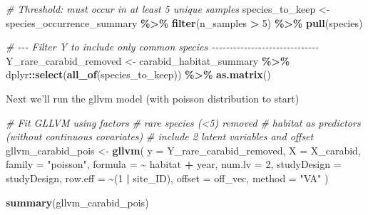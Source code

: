 \documentclass[
]{article}
\newenvironment{Shaded}{\begin{snugshade}}{\end{snugshade}}
\newcommand{\AttributeTok}[1]{\textcolor[rgb]{0.13,0.29,0.53}{#1}}
\newcommand{\CommentTok}[1]{\textcolor[rgb]{0.56,0.35,0.01}{\textit{#1}}}
\newcommand{\DecValTok}[1]{\textcolor[rgb]{0.00,0.00,0.81}{#1}}
\newcommand{\FunctionTok}[1]{\textcolor[rgb]{0.13,0.29,0.53}{\textbf{#1}}}
\newcommand{\NormalTok}[1]{#1}
\newcommand{\OtherTok}[1]{\textcolor[rgb]{0.56,0.35,0.01}{#1}}
\newcommand{\SpecialCharTok}[1]{\textcolor[rgb]{0.81,0.36,0.00}{\textbf{#1}}}
\newcommand{\StringTok}[1]{\textcolor[rgb]{0.31,0.60,0.02}{#1}}
\begin{document}
\begin{Shaded}
\begin{Highlighting}[]
\CommentTok{\# Threshold: must occur in at least 5 unique samples}
\NormalTok{species\_to\_keep }\OtherTok{\textless{}{-}}\NormalTok{ species\_occurrence\_summary }\SpecialCharTok{\%\textgreater{}\%}
  \FunctionTok{filter}\NormalTok{(n\_samples }\SpecialCharTok{\textgreater{}} \DecValTok{5}\NormalTok{) }\SpecialCharTok{\%\textgreater{}\%}
  \FunctionTok{pull}\NormalTok{(species)}

\CommentTok{\# {-}{-}{-} Filter Y to include only common species {-}{-}{-}{-}{-}{-}{-}{-}{-}{-}{-}{-}{-}{-}{-}{-}{-}{-}{-}{-}{-}{-}{-}{-}{-}{-}{-}{-}{-}{-}}
\NormalTok{Y\_rare\_carabid\_removed }\OtherTok{\textless{}{-}}\NormalTok{ carabid\_habitat\_summary }\SpecialCharTok{\%\textgreater{}\%}
\NormalTok{  dplyr}\SpecialCharTok{::}\FunctionTok{select}\NormalTok{(}\FunctionTok{all\_of}\NormalTok{(species\_to\_keep)) }\SpecialCharTok{\%\textgreater{}\%}
  \FunctionTok{as.matrix}\NormalTok{()}
\end{Highlighting}
\end{Shaded}

Next we'll run the gllvm model (with poisson distribution to start)

\begin{Shaded}
\begin{Highlighting}[]
\CommentTok{\# Fit GLLVM using factors }
\CommentTok{\# rare species (\textless{}5) removed}
\CommentTok{\# habitat as predictors (without continuous covariates)}
\CommentTok{\# include 2 latent variables and offset}
\NormalTok{gllvm\_carabid\_pois }\OtherTok{\textless{}{-}} \FunctionTok{gllvm}\NormalTok{(}
  \AttributeTok{y =}\NormalTok{ Y\_rare\_carabid\_removed,}
  \AttributeTok{X =}\NormalTok{ X\_carabid,}
  \AttributeTok{family =} \StringTok{"poisson"}\NormalTok{,}
  \AttributeTok{formula =} \SpecialCharTok{\textasciitilde{}}\NormalTok{ habitat }\SpecialCharTok{+}\NormalTok{ year,}
  \AttributeTok{num.lv =} \DecValTok{2}\NormalTok{,}
  \AttributeTok{studyDesign =}\NormalTok{ studyDesign,}
  \AttributeTok{row.eff =} \SpecialCharTok{\textasciitilde{}}\NormalTok{(}\DecValTok{1} \SpecialCharTok{|}\NormalTok{ site\_ID),}
  \AttributeTok{offset =}\NormalTok{ off\_vec,}
  \AttributeTok{method =} \StringTok{"VA"}
\NormalTok{)}


\FunctionTok{summary}\NormalTok{(gllvm\_carabid\_pois)}
\end{Highlighting}
\end{Shaded}
\end{document}
